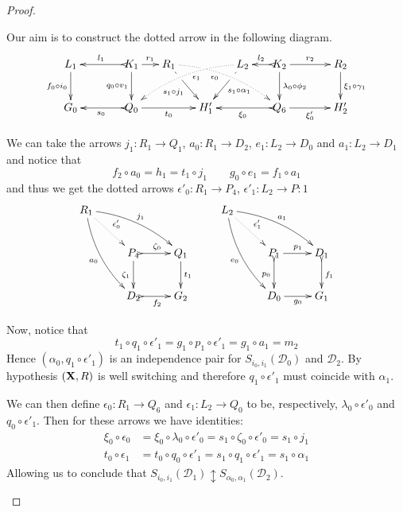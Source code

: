 \documentclass[a4paper,UKenglish,cleveref,pdftex,thm-restate,numberwithinsect,anonymous]{lipics}
\def\R{\mathsf{R}}
\def\X{\textbf {\textup{X}}}
\def\G{\textbf {\textup{G}}}
\newcommand{\dder}[1]{\mathscr{#1}}
\begin{document}
\begin{proof}
\begin{enumerate}
		Our aim is to construct the dotted arrow in the following diagram.
		\[\xymatrix@C=15pt{L_1 \ar[d]_{f_0\circ i_0}&& K_1
			\ar[d]_{q_0\circ v_1}\ar@{>->}[ll]_{l_1} \ar[r]^{r_1} & R_1
			\ar@{.>}@/^.35cm/[drrr]_(.4){\epsilon_0}|(.285)\hole
			\ar[dr]|(.28)\hole_{s_1\circ j_1} && L_2
			\ar@{.>}@/_.35cm/[dlll]^(.4){\epsilon_1}
			\ar[dl]|(.28)\hole^{s_1\circ \alpha_1}& K_2
			\ar[d]^{\lambda_0\circ \phi_2}\ar@{>->}[l]_{l_2} \ar[rr]^{r_2} &&
			R_2 \ar[d]^{\xi_1\circ \gamma_1}\\G_0 && \ar@{>->}[ll]^{s_0} Q_0
			\ar[rr]_{t_0}&& H'_1 && \ar@{>->}[ll]^{\xi_0} Q_6
			\ar[rr]_{\xi'_0}&& H'_2}\]
		
	We can take the arrows $j_1\colon R_1\to Q_1$, 
		$a_0\colon R_1\to D_2$, $e_1\colon L_2 \to D_0$ and $a_1\colon L_2\to D_1$ and notice that
		\[	f_2\circ a_0 =h_1 =t_1\circ j_1 \qquad   g_0\circ e_1=f_1\circ a_1\]
	and thus we get the dotted arrows $\epsilon'_0\colon R_1\to P_4$, $\epsilon'_1\colon L_2\to P:1$ 
		\[\xymatrix{R_1 \ar@{.>}[dr]^{\epsilon'_0} 
			\ar@/^.3cm/[drr]^{j_1} \ar@/_.3cm/[ddr]_{a_0}&&& L_2 \ar@{.>}[dr]^{\epsilon'_1}
			\ar@/^.3cm/[drr]^{a_1} \ar@/_.3cm/[ddr]_{e_0}\\ &P_4
			\ar@{>->}[r]^{\zeta_0} \ar[d]_{\zeta_1}& Q_1 \ar[d]^{t_1} &&P_1
			\ar[r]^{p_1} \ar@{>->}[d]_{p_0}& D_1 \ar@{>->}[d]^{f_1}\\
			&D_2\ar@{>->}[r]_{f_2} & G_2& 	&D_0\ar[r]_{g_0} & G_1} \]

	Now, notice that
\[
	t_1\circ q_1\circ \epsilon'_1  =g_1\circ p_1\circ \epsilon'_1  =g_1\circ a_1 =m_2
\]
Hence $(\alpha_0, q_1\circ \epsilon'_1)$ is an independence pair
for $S_{i_0, i_1}(\dder{D}_0)$ and $\dder{D}_2$. By hypothesis $(\X, \R)$ is well switching and therefore
$q_1\circ \epsilon'_1$ must coincide with $\alpha_1$.	
	
	
		We can then define $\epsilon_0\colon R_1\to Q_6$ and $\epsilon_1\colon L_2\to Q_0$ to be, respectively, 
		$\lambda_0\circ \epsilon'_0$ and $q_0\circ
		\epsilon'_1$. Then for these  arrows we have  identities:
		\begin{align*}
			\xi_0\circ \epsilon_0 & =\xi_0\circ \lambda_0\circ \epsilon'_0 =s_1\circ \zeta_0 \circ \epsilon'_0=s_1\circ j_1\\	t_0\circ \epsilon_1 & = t_0\circ q_0\circ \epsilon'_1 =s_1\circ q_1\circ \epsilon'_1=s_1\circ \alpha_1
		\end{align*}
		Allowing us to conclude that
		$S_{i_0,i_1}(\dder{D}_1)\updownarrow S_{\alpha_0,
			\alpha_1}(\dder{D}_2)$.  \qedhere
	\end{enumerate}
\end{proof}
\end{document}
